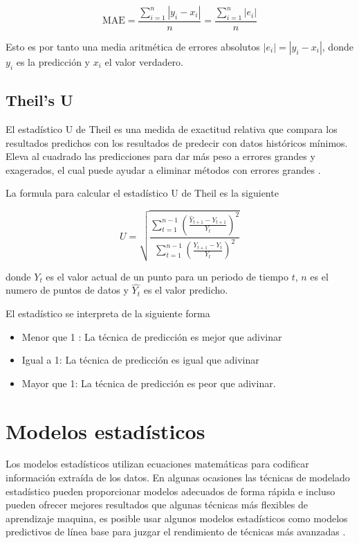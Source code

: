 \[
\mathrm{MAE}=\frac{\sum_{i=1}^{n}\left|y_{i}-x_{i}\right|}{n}=\frac{\sum_{i=1}^{n}\left|e_{i}\right|}{n}
\] 

Esto es por tanto una media aritmética de errores absolutos $\left|e_{i}\right| = \left|y_{i}-x_{i}\right|$, donde $y_i$ es la predicción y $x_i$ el valor verdadero.

\subsection{Theil's U}

El estadístico U de Theil es una medida de exactitud relativa que compara los resultados predichos con los resultados de predecir con datos históricos mínimos. Eleva al cuadrado las predicciones para dar más peso a errores grandes y exagerados, el cual puede ayudar a eliminar métodos con errores grandes \cite{OracleCrystalBall}.

La formula para calcular el estadístico U de Theil es la siguiente

\[
U=\sqrt{\frac{\sum_{t=1}^{n-1}\left(\frac{\hat{Y}_{t+1}-Y_{t+1}}{Y_{t}}\right)^{2}}{\sum_{t=1}^{n-1}\left(\frac{Y_{t+1}-Y_{t}}{Y_{t}}\right)^{2}}}
\]

donde $Y_t$ es el valor actual de un punto para un periodo de tiempo $t$, $n$ es el numero de puntos de datos y $\hat{Y_t}$ es el valor predicho.

El estadístico se interpreta de la siguiente forma

\begin{itemize}
	\item Menor que 1 : La técnica de predicción es mejor que adivinar
	\item  Igual a 1: La técnica de predicción es igual que adivinar
	\item Mayor que 1: La técnica de predicción es peor que adivinar.
\end{itemize}

\section{Modelos estadísticos}
\label{modelosestadisticos}
Los modelos estadísticos utilizan ecuaciones matemáticas para codificar información extraída de los datos. En algunas ocasiones las técnicas de modelado estadístico pueden proporcionar modelos adecuados de forma rápida e incluso pueden ofrecer mejores resultados que algunas técnicas más flexibles de aprendizaje maquina, es posible usar algunos modelos estadísticos como modelos predictivos de línea base para juzgar el rendimiento de técnicas más avanzadas \cite{IBMDocs2021}. 

